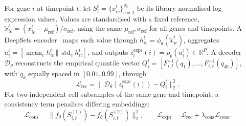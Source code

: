 \documentclass[10pt, letterpaper]{article}
\newcommand{\zex}{z^{\mathrm{expr}}}
\begin{document}
For gene $i$ at timepoint $t$, let $S_i^t=\{x_{ic}^t\}_{c=1}^{N_t}$ be its library-normalised log-expression values. Values are standardised with a fixed reference, $\widetilde{x}_{ic}^t=(x_{ic}^t-\mu_{\mathrm{ref}})/\sigma_{\mathrm{ref}}$, using the same $\mu_{\mathrm{ref}},\sigma_{\mathrm{ref}}$ for all genes and timepoints. A DeepSets encoder~\cite{zaheer2017deep} maps each value through $h_{ic}^t=\phi_\theta(\widetilde{x}_{ic}^t)$, aggregates $u_i^t=[\operatorname{mean}_c h_{ic}^t\,\Vert\,\operatorname{std}_c h_{ic}^t]$, and outputs $\zex_t(i)=\rho_\theta(u_i^t)\in\mathbb{R}^P$. A decoder $\mathcal{D}_\theta$ reconstructs the empirical quantile vector $Q_i^t=[F_{i,t}^{-1}(q_1),\ldots,F_{i,t}^{-1}(q_{49})]$, with $q_k$ equally spaced in $[0.01,0.99]$, through
\[
\mathcal{L}_{\mathrm{rec}}=\big\|\mathcal{D}_\theta(\zex_t(i))-Q_i^t\big\|_2^2 .
\]
For two independent cell subsamples of the same gene and timepoint, a consistency term penalises differing embeddings:
\[
\mathcal{L}_{\mathrm{cons}}=\big\|f_\theta(S_{i,t}^{(1)})-f_\theta(S_{i,t}^{(2)})\big\|_2^2,\qquad
\mathcal{L}_{\mathrm{expr}}=\mathcal{L}_{\mathrm{rec}}+\lambda_{\mathrm{cons}}\mathcal{L}_{\mathrm{cons}} .
\]
\end{document}

